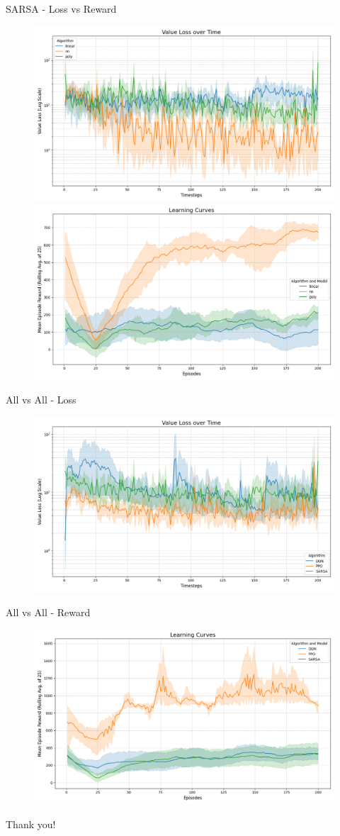 \documentclass[serif]{beamer}  %
\begin{document}
\begin{frame}{SARSA - Loss vs Reward}
    \begin{figure}
        \centering
        \includegraphics[width=0.48\linewidth]{plots/sarsa_value_loss_curve.png}
        \hfill
        \includegraphics[width=0.48\linewidth]{plots/sarsa_reward_curve.png}
    \end{figure}
\end{frame}

\begin{frame}{All vs All - Loss}
    \begin{figure}
        \centering
        \includegraphics[width=\linewidth]{../plots/all_value_loss_curve.png}
    \end{figure}
\end{frame}

\begin{frame}{All vs All - Reward}
    \begin{figure}
        \centering
        \includegraphics[width=\linewidth]{../plots/all_reward_curve.png}
    \end{figure}
\end{frame}


\begin{frame}
\centering
{\Huge Thank you!}
\end{frame}
\end{document}
